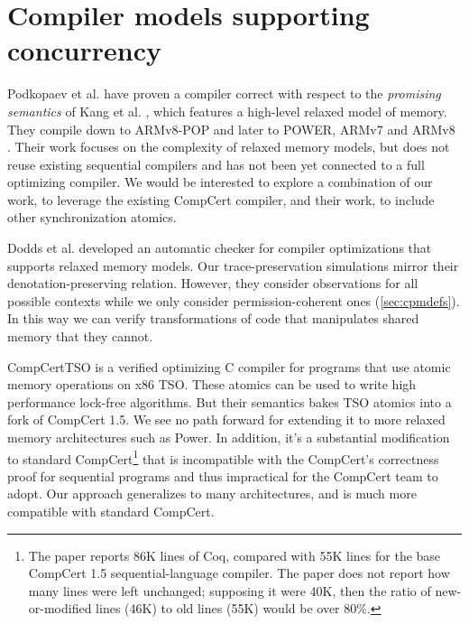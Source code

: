 \section{Compiler models supporting concurrency}
\label{sec:concurcompiler}

Podkopaev et al. \cite{Anton2017promising} have proven a compiler correct with respect to the \emph{promising semantics} of Kang et al. \cite{Kang2017promising}, which features a high-level relaxed model of memory. They compile down to ARMv8-POP and later to POWER, ARMv7 and ARMv8 \cite{Anton2019promising}. Their work focuses on the complexity of relaxed memory models, but does not reuse existing sequential compilers and has not been yet connected to a full optimizing compiler. We would be interested to explore a combination of our work, to leverage the existing CompCert compiler, and their work, to include other synchronization atomics.

Dodds et al. \cite{Dodds18} developed an automatic checker for compiler optimizations that supports relaxed memory models. Our trace-preservation simulations mirror their denotation-preserving relation. However, they consider observations for all possible contexts while we only consider permission-coherent ones (\autoref{sec:cpmdefs}). In this way we can verify transformations of code that manipulates shared memory that they cannot.



CompCertTSO \cite{Vafeiadis13compcertTSO} is a verified
optimizing C compiler for programs that use atomic memory operations on x86 TSO. These atomics can be used to write high performance lock-free
algorithms. But their semantics bakes TSO atomics into a fork of CompCert 1.5. We see no path forward for extending it to more relaxed memory architectures such as Power. In addition, it's a substantial modification to standard CompCert\footnote{The paper
  \cite{Vafeiadis13compcertTSO} reports 86K lines of Coq,
  compared with 55K lines for the base CompCert 1.5
  sequential-language compiler.  The paper does not report how many
  lines were left unchanged; supposing it were 40K, then the ratio of
  new-or-modified lines (46K) to old lines (55K) would be over 80\%.}
that is incompatible with the CompCert's correctness proof for
sequential programs and thus impractical for the CompCert team to
adopt. Our approach generalizes to many architectures, and is much
more compatible with standard CompCert.

